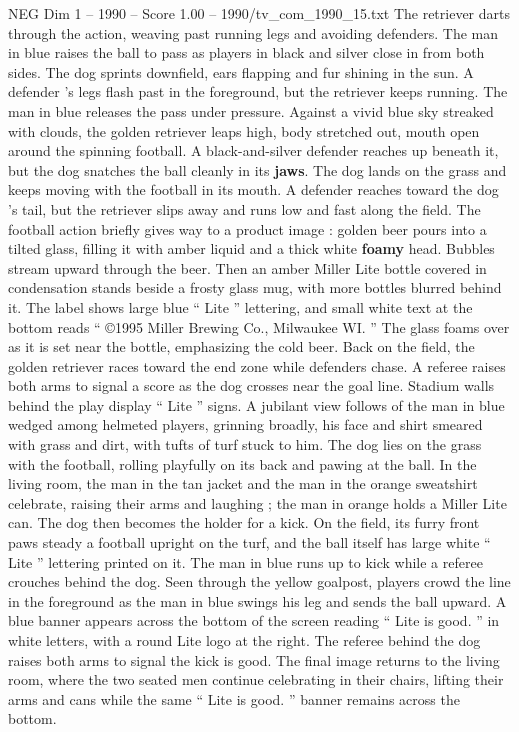 \begin{textsample}{NEG Dim 1 – 1990 – Score 1.00 – 1990/tv\_com\_1990\_15.txt}
The retriever darts through the action, weaving past running legs and avoiding defenders.
The man in blue raises the ball to pass as players in black and silver close in from both sides.
The dog sprints downfield, ears flapping and fur shining in the sun.
A defender ’s legs flash past in the foreground, but the retriever keeps running.
The man in blue releases the pass under pressure.
Against a vivid blue sky streaked with clouds, the golden retriever leaps high, body stretched out, mouth open around the spinning football.
A black-and-silver defender reaches up beneath it, but the dog snatches the ball cleanly in its \textbf{jaws}.
The dog lands on the grass and keeps moving with the football in its mouth.
A defender reaches toward the dog ’s tail, but the retriever slips away and runs low and fast along the field.
The football action briefly gives way to a product image : golden beer pours into a tilted glass, filling it with amber liquid and a thick white \textbf{foamy} head.
Bubbles stream upward through the beer.
Then an amber Miller Lite bottle covered in condensation stands beside a frosty glass mug, with more bottles blurred behind it.
The label shows large blue “ Lite ” lettering, and small white text at the bottom reads “ {\EmojiFont ©}1995 Miller Brewing Co., Milwaukee WI. ” The glass foams over as it is set near the bottle, emphasizing the cold beer.
Back on the field, the golden retriever races toward the end zone while defenders chase.
A referee raises both arms to signal a score as the dog crosses near the goal line.
Stadium walls behind the play display “ Lite ” signs.
A jubilant view follows of the man in blue wedged among helmeted players, grinning broadly, his face and shirt smeared with grass and dirt, with tufts of turf stuck to him.
The dog lies on the grass with the football, rolling playfully on its back and pawing at the ball.
In the living room, the man in the tan jacket and the man in the orange sweatshirt celebrate, raising their arms and laughing ; the man in orange holds a Miller Lite can.
The dog then becomes the holder for a kick.
On the field, its furry front paws steady a football upright on the turf, and the ball itself has large white “ Lite ” lettering printed on it.
The man in blue runs up to kick while a referee crouches behind the dog.
Seen through the yellow goalpost, players crowd the line in the foreground as the man in blue swings his leg and sends the ball upward.
A blue banner appears across the bottom of the screen reading “ Lite is good. ” in white letters, with a round Lite logo at the right.
The referee behind the dog raises both arms to signal the kick is good.
The final image returns to the living room, where the two seated men continue celebrating in their chairs, lifting their arms and cans while the same “ Lite is good. ” banner remains across the bottom.

\end{textsample}
